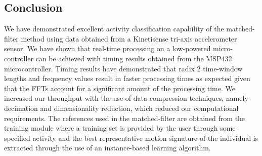\documentclass{sciposter}
\begin{document}
\begin{multicols}{3}
\section{Conclusion}
We have demonstrated excellent activity classification capability of the matched-filter method using data obtained from a Kinetisense tri-axis accelerometer sensor.
We have shown that real-time processing on a low-powered micro-controller can be achieved with timing results obtained from the MSP432 microcontroller.
Timing results have demonstrated that radix 2 time-window lengths and frequency values result in faster processing times as expected given that the FFTs account for a significant amount of the processing time.
We increased our throughput with the use of data-compression techniques, namely decimation and dimensionality reduction, which reduced our computational requirements.
The references used in the matched-filter are obtained from the training module where a training set is provided by the user through some specified activity and the best representative motion signature of the individual is extracted through the use of an instance-based learning algorithm.




\end{multicols}
\end{document}
